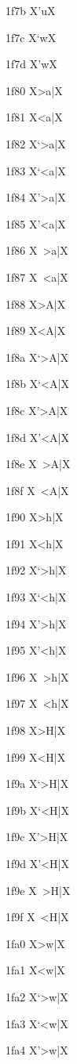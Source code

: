 \documentclass[11pt]{article}
\begin{document}
1f7b X{\textgreek{'u}}X

1f7c X{\textgreek{`w}}X

1f7d X{\textgreek{'w}}X

1f80 X{\textgreek{>a|}}X

1f81 X{\textgreek{<a|}}X

1f82 X{\textgreek{`>a|}}X

1f83 X{\textgreek{`<a|}}X

1f84 X{\textgreek{'>a|}}X

1f85 X{\textgreek{'<a|}}X

1f86 X{\textgreek{~>a|}}X

1f87 X{\textgreek{~<a|}}X

1f88 X{\textgreek{>A|}}X

1f89 X{\textgreek{<A|}}X

1f8a X{\textgreek{`>A|}}X

1f8b X{\textgreek{`<A|}}X

1f8c X{\textgreek{'>A|}}X

1f8d X{\textgreek{'<A|}}X

1f8e X{\textgreek{~>A|}}X

1f8f X{\textgreek{~<A|}}X

1f90 X{\textgreek{>h|}}X

1f91 X{\textgreek{<h|}}X

1f92 X{\textgreek{`>h|}}X

1f93 X{\textgreek{`<h|}}X

1f94 X{\textgreek{'>h|}}X

1f95 X{\textgreek{'<h|}}X

1f96 X{\textgreek{~>h|}}X

1f97 X{\textgreek{~<h|}}X

1f98 X{\textgreek{>H|}}X

1f99 X{\textgreek{<H|}}X

1f9a X{\textgreek{`>H|}}X

1f9b X{\textgreek{`<H|}}X

1f9c X{\textgreek{'>H|}}X

1f9d X{\textgreek{'<H|}}X

1f9e X{\textgreek{~>H|}}X

1f9f X{\textgreek{~<H|}}X

1fa0 X{\textgreek{>w|}}X

1fa1 X{\textgreek{<w|}}X

1fa2 X{\textgreek{`>w|}}X

1fa3 X{\textgreek{`<w|}}X

1fa4 X{\textgreek{'>w|}}X
\end{document}
